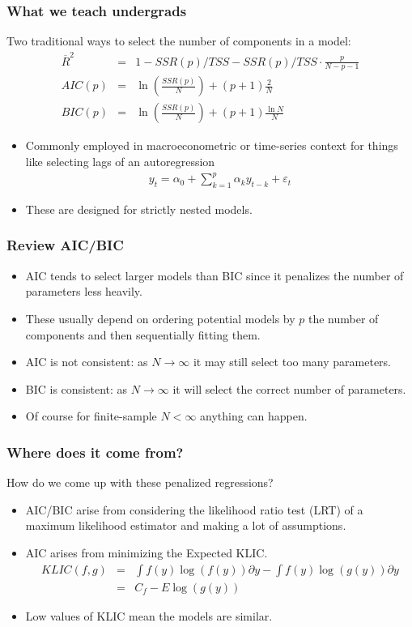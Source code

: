\documentclass[xcolor=pdftex,dvipsnames,table,mathserif]{beamer}
\begin{document}
\begin{frame}
\frametitle{What we teach undergrads}
Two traditional ways to select the number of components in a model:\\
\begin{eqnarray*}
\overline{R}^2  &=& 1-SSR(p)/TSS - SSR(p)/TSS \cdot \frac{p}{N-p-1} \\
AIC(p) &=& \ln\left(\frac{SSR(p)}{N}\right) + (p+1)\frac{2}{N}\\
BIC(p) &=& \ln \left(\frac{SSR(p)}{N} \right) + (p+1)\frac{\ln N}{N}
\end{eqnarray*}
\begin{itemize}
\item Commonly employed in macroeconometric or time-series context for things like selecting lags of an autoregression
\begin{eqnarray*}
y_t = \alpha_0 + \sum_{k=1}^p \alpha_k y_{t-k} + \varepsilon_t
\end{eqnarray*}
\item These are designed for strictly \alert{nested} models.
\end{itemize}
\end{frame}

\begin{frame}
\frametitle{Review AIC/BIC}
\begin{itemize}
\item AIC tends to select larger models than BIC since it penalizes the number of parameters less heavily.
\item These usually depend on ordering potential models by $p$ the number of components and then sequentially fitting them.
\item AIC is not consistent: as $N \rightarrow \infty$ it may still select too many parameters.
\item BIC is consistent: as $N \rightarrow \infty$ it will select the correct number of parameters.
\item Of course for finite-sample $N < \infty$ anything can happen.
\end{itemize}
\end{frame}

\begin{frame}
\frametitle{Where does it come from?}
How do we come up with these penalized regressions?
\begin{itemize}
\item AIC/BIC arise from considering the likelihood ratio test (LRT) of a maximum likelihood estimator and making a lot of assumptions.
\item AIC arises from minimizing the Expected KLIC.
\begin{eqnarray*}
KLIC(f,g) &=& \int  f(y) \log(f(y)) \partial y - \int  f(y) \log(g(y)) \partial y  \\
&=& C_f - E  \log(g(y))
\end{eqnarray*}
\item Low values of KLIC mean the models are similar.
\end{itemize}
\end{frame}
\end{document}
